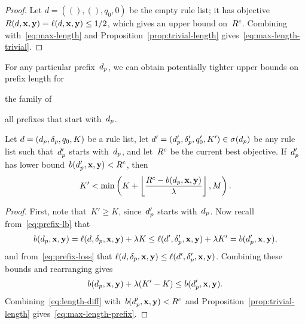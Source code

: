 \begin{arxiv}
\begin{proof}
Let ${d = ((), (), q_0, 0)}$ be the empty rule list;
it has objective ${R({d}, \mathbf{x}, \mathbf{y}) = \ell({d}, \mathbf{x}, \mathbf{y}) \le 1/2}$,
which gives an upper bound on~${R^c}$.
%
Combining with~\eqref{eq:max-length}
and Proposition~\ref{prop:trivial-length}
gives~\eqref{eq:max-length-trivial}.
\end{proof}
\end{arxiv}

For any particular prefix~$d_p$, we can obtain potentially tighter
upper bounds on prefix length for
\begin{arxiv}
the family of
\end{arxiv}
all prefixes that start with~$d_p$.

%

\begin{theorem}
\label{thm:ub-prefix-specific}
Let ${{d} = (d_p, \delta_p, q_0, K)}$ be a rule list, let
${{d}' = (d_p', \delta_p', q_0', K') \in \sigma(d_p)}$
be any rule list such that~$d_p'$ starts with~$d_p$,
and let~${R^c}$ be the current best objective.
%
If~$d_p'$ has lower bound~${b(d_p', \mathbf{x}, \mathbf{y}) < {R^c}}$, then
\begin{align}
K' < \min \left( K + \left\lfloor \frac{{R^c} - b(d_p, \mathbf{x}, \mathbf{y})}{{\lambda}} \right\rfloor, M \right).
\label{eq:max-length-prefix}
\end{align}
\end{theorem}

\begin{arxiv}
\begin{proof}
First, note that~${K' \ge K}$, since~$d_p'$ starts with~$d_p$.
%
Now recall from~\eqref{eq:prefix-lb} that
%
\begin{align}
b(d_p, \mathbf{x}, \mathbf{y}) = \ell({d}, \delta_p, \mathbf{x}, \mathbf{y}) + {\lambda} K
\le \ell({d}', \delta_p', \mathbf{x}, \mathbf{y}) + {\lambda} K' = b(d_p', \mathbf{x}, \mathbf{y}),
\end{align}
%
and from~\eqref{eq:prefix-loss} that
${\ell({d}, \delta_p, \mathbf{x}, \mathbf{y}) \le \ell({d}', \delta_p', \mathbf{x}, \mathbf{y})}$.
%
Combining these bounds and rearranging gives
\begin{align}
b(d_p, \mathbf{x}, \mathbf{y}) + {\lambda} (K' - K) \le b(d_p', \mathbf{x}, \mathbf{y}).
\label{eq:length-diff}
\end{align}
Combining~\eqref{eq:length-diff} with~${b(d_p', \mathbf{x}, \mathbf{y}) < {R^c}}$
and Proposition~\ref{prop:trivial-length} gives~\eqref{eq:max-length-prefix}.
\end{proof}
\end{arxiv}

